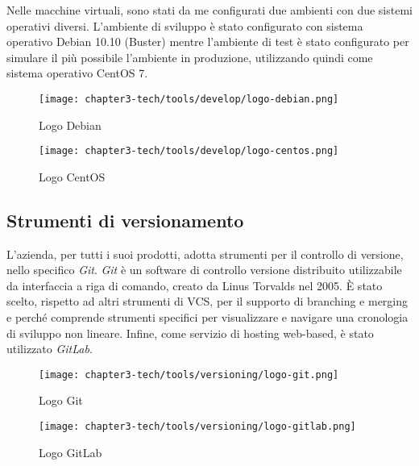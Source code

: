 \noindent
Nelle macchine virtuali, sono stati da me configurati due ambienti con due sistemi operativi diversi. L'ambiente di sviluppo è stato configurato con sistema operativo Debian 10.10 (Buster) mentre l'ambiente di test è stato configurato per simulare il più possibile l'ambiente in produzione, utilizzando quindi come sistema operativo CentOS 7.
\begin{figure}[!h]
    \begin{minipage}{.5\textwidth} 
        \centering 
        \texttt{[image: chapter3-tech/tools/develop/logo-debian.png]} 
        \caption{Logo Debian} 
        \label{fig:virtualbox} 
    \end{minipage}%
    \begin{minipage}{.5\textwidth} 
        \centering 
        \texttt{[image: chapter3-tech/tools/develop/logo-centos.png]} 
        \caption{Logo CentOS} 
        \label{fig:pycharm} 
    \end{minipage}  
\end{figure}
\subsection{Strumenti di versionamento}

L’azienda, per tutti i suoi prodotti, adotta strumenti per il controllo di versione, nello specifico \emph{Git}. \emph{Git} è un software di controllo versione distribuito utilizzabile da interfaccia a riga di comando, creato da Linus Torvalds nel 2005. È stato scelto, rispetto ad altri strumenti di \gls{VCS}, per il supporto di branching e merging e perché comprende strumenti specifici per visualizzare e navigare una cronologia di sviluppo non lineare. Infine, come servizio di hosting web-based, è stato utilizzato \emph{GitLab}.

\begin{figure}[!h]
    \begin{minipage}{.5\textwidth} 
        \centering 
        \texttt{[image: chapter3-tech/tools/versioning/logo-git.png]} 
        \caption{Logo Git} 
        \label{fig:git} 
    \end{minipage}%
    \begin{minipage}{.5\textwidth} 
        \centering 
        \texttt{[image: chapter3-tech/tools/versioning/logo-gitlab.png]} 
        \caption{Logo GitLab} 
        \label{fig:gitlab} 
    \end{minipage}  
\end{figure}

